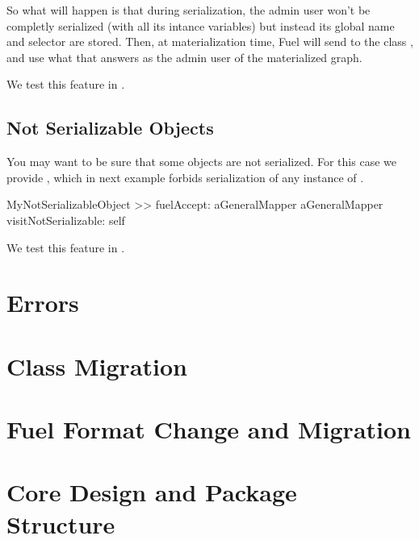 \documentclass[a4paper,10pt,twoside]{book}
\begin{document}
So what will happen is that during serialization, the admin user won't be completly serialized (with all its intance variables) but instead its global name and selector are stored. Then, at materialization time, Fuel will send  to the class , and use what that answers as the admin user of the materialized graph. 

We test this feature in .


\subsection{Not Serializable Objects}

You may want to be sure that some objects are not serialized. For this case we provide , which in next example forbids serialization of any instance of .

\begin{code}
MyNotSerializableObject >> fuelAccept: aGeneralMapper
    aGeneralMapper visitNotSerializable: self
\end{code}

We test this feature in .


\section{Errors}



\section{Class Migration}


\section{Fuel Format Change and Migration}



\section{Core Design and Package Structure}
\end{document}
